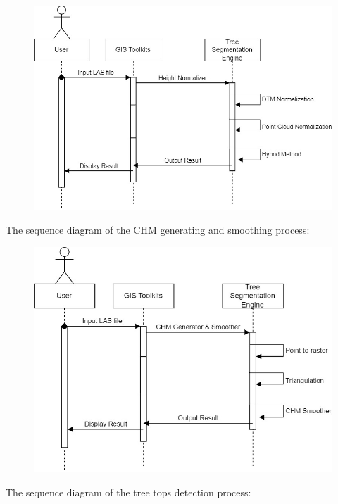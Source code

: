 \documentclass[a4paper, 12pt]{article}
\begin{document}
\begin{figure}[H]
    \centering
    \includegraphics[scale=0.4]{Images/sequenceDiagram-Height Normalizer.jpg}
\end{figure}
\newpage
The sequence diagram of the CHM generating and smoothing process:

\begin{figure}[H]
    \centering
    \includegraphics[scale=0.4]{Images/sequenceDiagram-CHM Generator & Smoother.jpg}
\end{figure}

The sequence diagram of the tree tops detection process:
\end{document}
